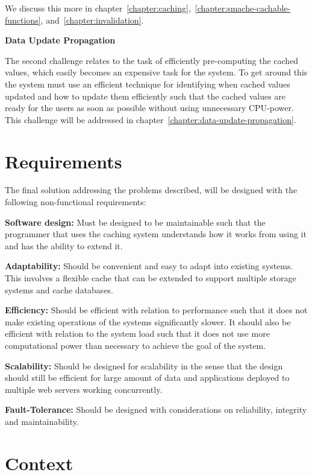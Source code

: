 We discuss this more in chapter~\ref{chapter:caching},~\ref{chapter:smache-cachable-functions}, and~\ref{chapter:invalidation}.

\textbf{Data Update Propagation}

The second challenge relates to the task of efficiently pre-computing the cached values, which easily becomes an expensive task for the system. To get around this the system must use an efficient technique for identifying when cached values updated and how to update them efficiently such that the cached values are ready for the users as soon as possible without using unnecessary CPU-power. This challenge will be addressed in chapter~\ref{chapter:data-update-propagation}.


\section{Requirements}
\label{sec:requirements}

The final solution addressing the problems described, will be designed with the following non-functional requirements:

\textbf{Software design:} Must be designed to be maintainable such that the programmer that uses the caching system understands how it works from using it and has the ability to extend it.

\textbf{Adaptability:} Should be convenient and easy to adapt into existing systems. This involves a flexible cache that can be extended to support multiple storage systems and cache databases.

\textbf{Efficiency:} Should be efficient with relation to performance such that it does not make existing operations of the systems significantly slower. It should also be efficient with relation to the system load such that it does not use more computational power than necessary to achieve the goal of the system.

\textbf{Scalability:} Should be designed for scalability in the sense that the design should still be efficient for large amount of data and applications deployed to multiple web servers working concurrently.

\textbf{Fault-Tolerance:} Should be designed with considerations on reliability, integrity and maintainability.


\section{Context}
\label{sec:context}

